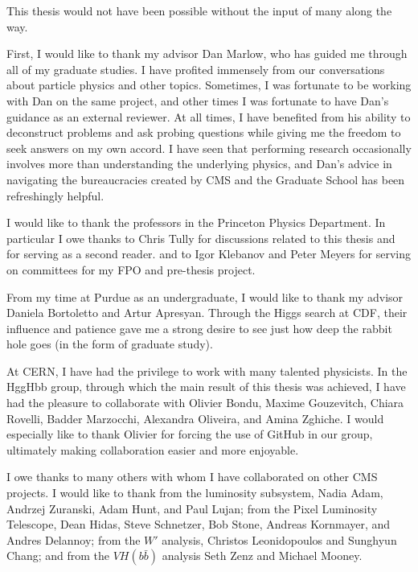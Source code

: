 This thesis would not have been possible without the input of many along the way.

First, I would like to thank my advisor Dan Marlow, who has guided me through all of my graduate
studies. I have profited immensely from our conversations about
particle physics and other topics. Sometimes, I was fortunate to be working with Dan on the same
project, and other times I was fortunate to have Dan's guidance as an external reviewer. At all
times, I have benefited from his ability to deconstruct problems and ask probing questions
while giving me the freedom to seek answers on my own accord.
I have seen that performing research occasionally involves
more than understanding the underlying physics,
and Dan's advice in navigating the bureaucracies created by
CMS and the Graduate School has been refreshingly helpful.

I would like to thank the professors in the Princeton Physics Department. In particular
I owe thanks to Chris Tully for discussions related to this thesis and for serving as a second reader.
and to Igor Klebanov and Peter Meyers for serving on committees for my FPO and pre-thesis project.

From my time at Purdue as an undergraduate, I would like to thank my advisor Daniela Bortoletto and
Artur Apresyan. Through the Higgs search at CDF,
their influence and patience gave me a strong desire to
see just how deep the rabbit hole goes (in the form of graduate study).

At CERN, I have had the privilege to work with many talented physicists. In the HggHbb group,
through which the main result of this thesis was achieved, I have had the pleasure to collaborate with
Olivier Bondu, Maxime Gouzevitch, Chiara Rovelli, Badder Marzocchi, Alexandra Oliveira, and
Amina Zghiche. I would especially like to thank Olivier for forcing the use of GitHub in our group,
ultimately making collaboration easier and more enjoyable.

I owe thanks to many others with whom I have collaborated on other CMS projects.
I would like to thank
from the luminosity subsystem, Nadia Adam, Andrzej Zuranski, Adam Hunt, and Paul Lujan;
from the Pixel Luminosity Telescope, Dean Hidas, Steve Schnetzer, Bob Stone, Andreas Kornmayer, and Andres Delannoy;
from the $W'$ analysis, Christos Leonidopoulos and Sunghyun Chang; and
from the $VH(b\bar{b})$ analysis Seth Zenz and Michael Mooney.


